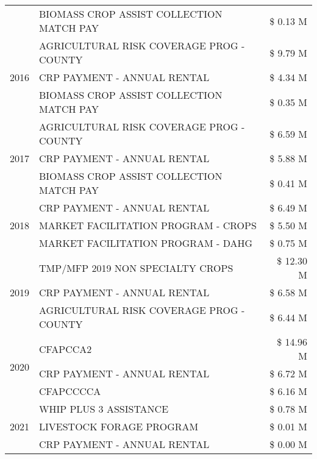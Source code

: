 \begin{tabular}{llr}
 & BIOMASS CROP ASSIST COLLECTION MATCH PAY & \$ 0.13 M \\
\cline{1-3}
\multirow[t]{3}{*}{2016} & AGRICULTURAL RISK COVERAGE PROG - COUNTY & \$ 9.79 M \\
 & CRP PAYMENT - ANNUAL RENTAL & \$ 4.34 M \\
 & BIOMASS CROP ASSIST COLLECTION MATCH PAY & \$ 0.35 M \\
\cline{1-3}
\multirow[t]{3}{*}{2017} & AGRICULTURAL RISK COVERAGE PROG - COUNTY & \$ 6.59 M \\
 & CRP PAYMENT - ANNUAL RENTAL & \$ 5.88 M \\
 & BIOMASS CROP ASSIST COLLECTION MATCH PAY & \$ 0.41 M \\
\cline{1-3}
\multirow[t]{3}{*}{2018} & CRP PAYMENT - ANNUAL RENTAL & \$ 6.49 M \\
 & MARKET FACILITATION PROGRAM - CROPS & \$ 5.50 M \\
 & MARKET FACILITATION PROGRAM - DAHG & \$ 0.75 M \\
\cline{1-3}
\multirow[t]{3}{*}{2019} & TMP/MFP 2019 NON SPECIALTY CROPS & \$ 12.30 M \\
 & CRP PAYMENT - ANNUAL RENTAL & \$ 6.58 M \\
 & AGRICULTURAL RISK COVERAGE PROG - COUNTY & \$ 6.44 M \\
\cline{1-3}
\multirow[t]{3}{*}{2020} & CFAPCCA2 & \$ 14.96 M \\
 & CRP PAYMENT - ANNUAL RENTAL & \$ 6.72 M \\
 & CFAPCCCCA & \$ 6.16 M \\
\cline{1-3}
\multirow[t]{3}{*}{2021} & WHIP PLUS 3 ASSISTANCE & \$ 0.78 M \\
 & LIVESTOCK FORAGE PROGRAM & \$ 0.01 M \\
 & CRP PAYMENT - ANNUAL RENTAL & \$ 0.00 M \\
\cline{1-3}
\bottomrule
\end{tabular}
